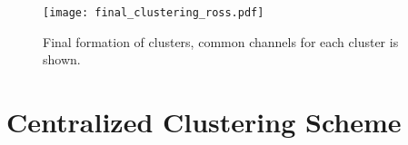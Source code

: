 \begin{comment}
As an example, when node A comes to decide which cluster to stay, the memberships of relevant clusters, like $C_C$ and $C_H$, are $\{C,B,D,A\}$ and $\{H,B,G,A\}$ respectively. Before the other two debatable nodes B and D making their belonging clear, cluster $C_C$ and $C_H$ have them in the same time. So node A can decide which cluster to belong to without considering other debatable nodes' action. There are two strategies for node A, which is illustrated in Figure \ref{fig3}. Because staying in cluster $C_C$ brings in more common channels within relevant clusters, node A finally choose cluster $C_C$ to stay and caveat from cluster $C_H$. The membership of $C_H$ is updated in the same time. Node B and D undertake the same process and the clusters are formed finally as Figure \ref{fig4} shows.

Because debatable nodes can conduct membership clarification abased on static membership information of relevant clusters, thus no iteration happens in this process. The time complexity of this algorithm is only decided by the number of debatable nodes, which is maximal $O(\vert I\vert)$. 

As an example, when node A comes to decide which cluster to stay, the memberships of relevant clusters, like $C_C$ and $C_H$, are $\{C,B,D,A\}$ and $\{H,B,G,A\}$ respectively. Before the other two debatable nodes B and D making their belonging clear, cluster $C_C$ and $C_H$ have them in the same time. So node A can decide which cluster to belong to without considering other debatable nodes' action. Figure \ref{AinC}. Because staying in cluster $C_C$ brings in more common channels within relevant clusters, node A finally choose cluster $C_C$ to stay and retreat from cluster $C_H$. The membership of $C_H$ is updated in the same time. Node B and D undertake the same process and the clusters are formed finally as Figure \ref{fig4} shows.
\end{comment}


\begin{figure}[h]
  \centering
  \texttt{[image: final\_clustering\_ross.pdf]}
  \caption{Final formation of clusters, common channels for each cluster is shown.}
  \label{fig4}
\end{figure}


\newpage
\section{Centralized Clustering Scheme}
\label{centralized_scheme}

